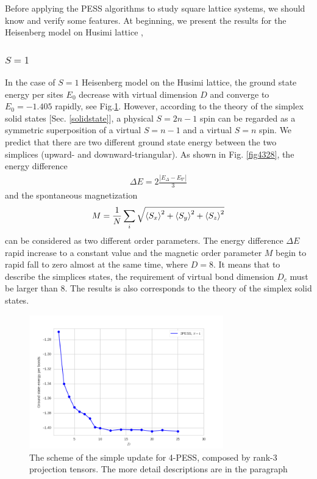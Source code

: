 Before applying the PESS algorithms to study square lattice systems, we should know and verify some features. At beginning, we present the results for the Heisenberg model on Husimi lattice \cite{},

\subsubsection{$S=1$}

In the case of $S=1$ Heisenberg model on the Husimi lattice, the ground state energy per sites $E_0$ decrease with virtual dimension $D$ and converge to $E_0=-1.405$ rapidly, see Fig.\ref{fig4327}. However, according to the theory of the simplex solid states [Sec. \ref{solidstate}], a physical $S=2n-1$ spin can be regarded as a symmetric superposition of a virtual $S=n-1$ and a virtual $S=n$ spin. We predict that there are two different ground state energy between the two simplices (upward- and downward-triangular). As shown in Fig. \ref{fig4328}, the energy difference
\begin{align}
	\Delta E = 2 \frac{|E_{\Delta}-E_{\nabla}|}{3}
\end{align}
and the spontaneous magnetization
\begin{align}
	M = \frac{1}{N} \sum_{i}{\sqrt{\braket{S_x}^2 + \braket{S_y}^2 + \braket{S_z}^2}}
\end{align}
can be considered as two different order parameters. The energy difference $\Delta E$ rapid increase to a constant value and the magnetic order parameter $M$ begin to rapid fall to zero almost at the same time, where $D=8$. It means that to describe the simplices states, the requirement of virtual bond dimension $D_c$ must be larger than $8$. The results is also corresponds to the theory of the simplex solid states.

\begin{figure}[H]
	\centering
	\includegraphics[width=0.75\textwidth]{figures/3pess_S1GE.png}
	\caption[The scheme of the simple update for 4-PESS, composed by rank-3 projection tensors.]{The scheme of the simple update for 4-PESS, composed by rank-3 projection tensors. The more detail descriptions are in the paragraph}
	\label{fig4327}
\end{figure}

